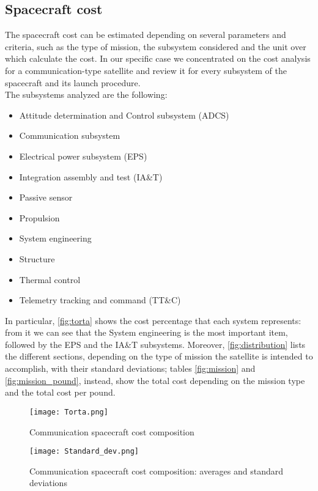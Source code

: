 \subsection{Spacecraft cost}
	The spacecraft cost can be estimated depending on several parameters and criteria, such as the type of mission, the 				subsystem considered and the unit over which calculate the cost. In our specific case we concentrated on the cost analysis 		for a communication-type satellite and review it for every subsystem of the spacecraft and its launch procedure.\\

	The subsystems analyzed  are the following:
	\begin{itemize}
		\item Attitude determination and Control subsystem (ADCS)
		\item Communication subsystem
		\item Electrical power subsystem (EPS)
		\item Integration assembly and test (IA\&T)
		\item Passive sensor
		\item Propulsion
		\item System engineering
		\item Structure
		\item Thermal control
		\item Telemetry tracking and command (TT\&C)
	\end{itemize}
	In particular, \autoref{fig:torta} shows the cost percentage that each system represents: from it we can see that the 				System engineering is the most important item, followed by the EPS and the IA\&T subsystems. Moreover, 						\autoref{fig:distribution} lists the different sections, depending on the type of mission the satellite is intended to 					accomplish, with their standard deviations; tables \ref{fig:mission} and \ref{fig:mission_pound}, instead, show the total 			cost depending on the mission type and the total cost per pound.

	\begin{figure}
		\centering
		\texttt{[image: Torta.png]}
		\caption{Communication spacecraft cost composition}
		\label{fig:torta}
	\end{figure}

	\begin{figure}
		\centering
		\texttt{[image: Standard\_dev.png]}
		\caption{Communication spacecraft cost composition: averages and standard deviations}
		\label{fig:distribution}
	\end{figure}


